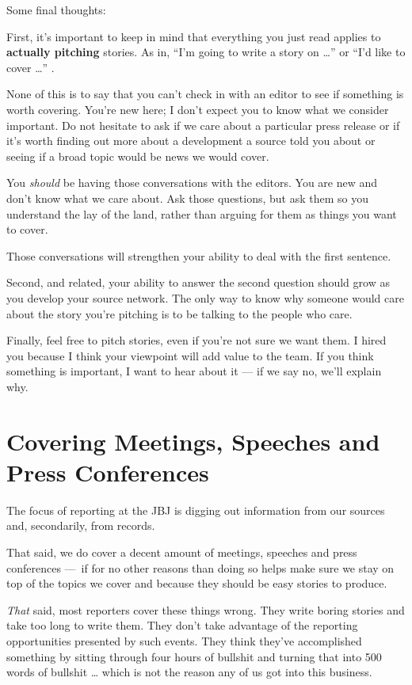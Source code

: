 \documentclass[
  11pt,
  american,
  letterpaperpaper,
  extrafontsizes,onecolumn,openright
  ]{memoir}
\begin{document}
Some final thoughts:

First, it's important to keep in mind that everything you just read applies to \textbf{actually pitching} stories. As in, \enquote{I'm going to write a story on \ldots{}} or \enquote{I'd like to cover \ldots{}} .

None of this is to say that you can't check in with an editor to see if something is worth covering. You're new here; I don't expect you to know what we consider important. Do not hesitate to ask if we care about a particular press release or if it's worth finding out more about a development a source told you about or seeing if a broad topic would be news we would cover.

You \emph{should} be having those conversations with the editors. You are new and don't know what we care about.
Ask those questions, but ask them so you understand the lay of the land, rather than arguing for them as things you want to cover.

Those conversations will strengthen your ability to deal with the first sentence.

Second, and related, your ability to answer the second question should grow as you develop your source network. The only way to know why someone would care about the story you're pitching is to be talking to the people who care.

Finally, feel free to pitch stories, even if you're not sure we want them. I hired you because I think your viewpoint will add value to the team. If you think something is important, I want to hear about it --- if we say no, we'll explain why.

\hypertarget{covering-meetings-speeches-and-press-conferences}{%
\chapter{Covering Meetings, Speeches and Press Conferences}\label{covering-meetings-speeches-and-press-conferences}}

The focus of reporting at the JBJ is digging out information from our sources and, secondarily, from records.

That said, we do cover a decent amount of meetings, speeches and press conferences ---~if for no other reasons than doing so helps make sure we stay on top of the topics we cover and because they should be easy stories to produce.

\emph{That} said, most reporters cover these things wrong. They write boring stories and take too long to write them. They don't take advantage of the reporting opportunities presented by such events. They think they've accomplished something by sitting through four hours of bullshit and turning that into 500 words of bullshit \ldots{} which is not the reason any of us got into this business.
\end{document}
